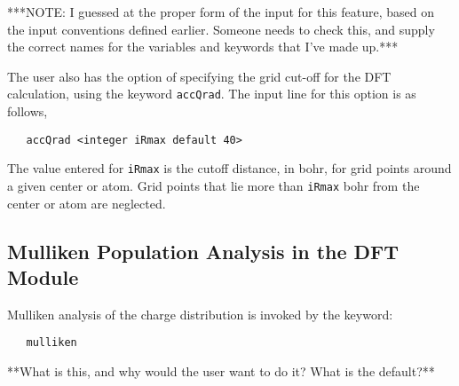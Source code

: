 \Large
***NOTE: I guessed at the proper form of the input for this feature, based
on the input conventions defined earlier.  Someone needs to check this,
and supply the correct names for the variables and keywords that I've made
up.***


The user also has the option of specifying the grid cut-off for the
DFT calculation, using the keyword \verb+accQrad+.  The input line for
this option is as follows,

\begin{verbatim}
   accQrad <integer iRmax default 40>
\end{verbatim}

The value entered for \verb+iRmax+ is the cutoff distance, in bohr, for grid
points around a given center or atom.  Grid points that lie more than 
\verb+iRmax+ bohr from the center or atom are neglected. 

\subsection{Mulliken Population Analysis in the DFT Module}

Mulliken analysis of the charge distribution is invoked by the keyword:
\begin{verbatim}
   mulliken
\end{verbatim}

\Large
**What is this, and why would the user want to do it?  What is the default?**
\normalsize


